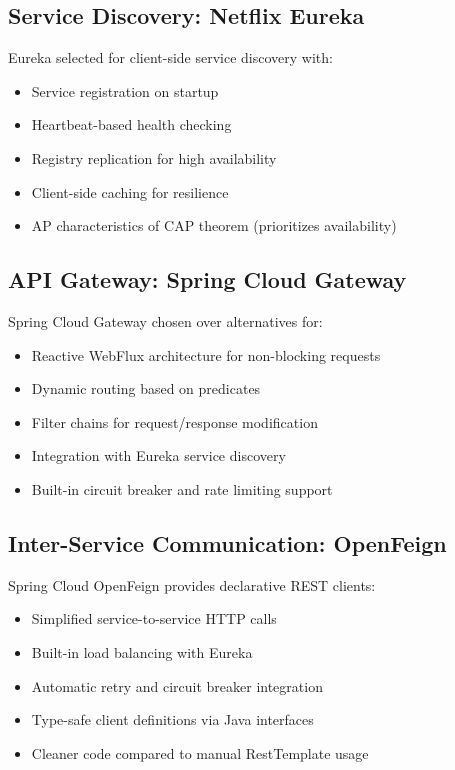 \subsection{Service Discovery: Netflix Eureka}

Eureka selected for client-side service discovery with:
\begin{itemize}
    \item Service registration on startup
    \item Heartbeat-based health checking
    \item Registry replication for high availability
    \item Client-side caching for resilience
    \item AP characteristics of CAP theorem (prioritizes availability)
\end{itemize}

\subsection{API Gateway: Spring Cloud Gateway}

Spring Cloud Gateway chosen over alternatives for:
\begin{itemize}
    \item Reactive WebFlux architecture for non-blocking requests
    \item Dynamic routing based on predicates
    \item Filter chains for request/response modification
    \item Integration with Eureka service discovery
    \item Built-in circuit breaker and rate limiting support
\end{itemize}

\subsection{Inter-Service Communication: OpenFeign}

Spring Cloud OpenFeign provides declarative REST clients:
\begin{itemize}
    \item Simplified service-to-service HTTP calls
    \item Built-in load balancing with Eureka
    \item Automatic retry and circuit breaker integration
    \item Type-safe client definitions via Java interfaces
    \item Cleaner code compared to manual RestTemplate usage
\end{itemize}

